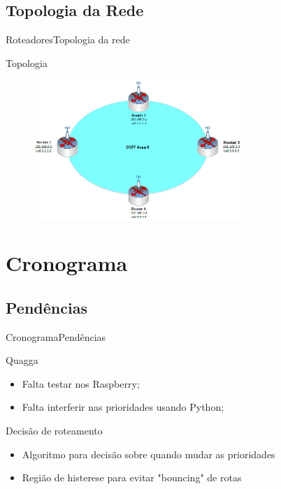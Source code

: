 \documentclass{beamer}
\begin{document}
\subsection{Topologia da Rede}
\begin{frame}[fragile]{Roteadores}{Topologia da rede}

    \begin{block}{Topologia} 
        \begin{figure}[t]
            \centerline{\includegraphics[width=0.7\textwidth]{img/topology.eps}}    
        \end{figure}    
    \end{block}
\end{frame}

\section{Cronograma}

\subsection{Pendências}

\begin{frame}[fragile]{Cronograma}{Pendências}

    \begin{block}{Quagga}    
        \begin{itemize}
            \item Falta testar nos Raspberry;
            \item Falta interferir nas prioridades usando Python;
        \end{itemize}
    \end{block}

    \begin{block}{Decisão de roteamento}
        \begin{itemize}
            \item Algoritmo para decisão sobre quando mudar as prioridades
            \item Região de histerese para evitar "bouncing" de rotas
        \end{itemize}
    \end{block}
\end{frame}
\end{document}
